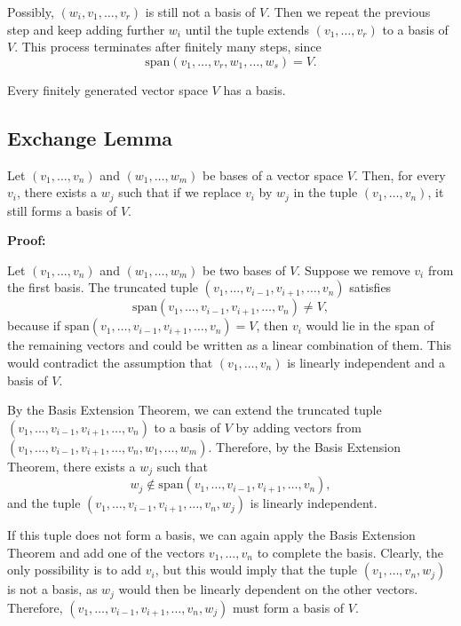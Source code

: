 Possibly, \((w_i, v_1, \ldots, v_r)\) is still not a basis of \(V\). Then we repeat the previous step and keep adding further \(w_i\) until the tuple extends \((v_1, \ldots, v_r)\) to a basis of \(V\). This process terminates after finitely many steps, since
\[
\text{span}(v_1, \ldots, v_r, w_1, \ldots, w_s) = V.
\]
\QED
\vspace{\baselineskip}

Every finitely generated vector space \(V\) has a basis.

\subsection{Exchange Lemma}

Let \((v_1, \ldots, v_n)\) and \((w_1, \ldots, w_m)\) be bases of a vector space \(V\). Then, for every \(v_i\), there exists a \(w_j\) such that if we replace \(v_i\) by \(w_j\) in the tuple \((v_1, \ldots, v_n)\), it still forms a basis of \(V\).
\vspace{\baselineskip}

\textbf{Proof:}

Let \((v_1, \ldots, v_n)\) and \((w_1, \ldots, w_m)\) be two bases of \(V\). Suppose we remove \(v_i\) from the first basis. The truncated tuple \((v_1, \ldots, v_{i-1}, v_{i+1}, \ldots, v_n)\) satisfies
\[
\text{span}(v_1, \ldots, v_{i-1}, v_{i+1}, \ldots, v_n) \neq V,
\]
because if \(\text{span}(v_1, \ldots, v_{i-1}, v_{i+1}, \ldots, v_n) = V\), then \(v_i\) would lie in the span of the remaining vectors and could be written as a linear combination of them. This would contradict the assumption that \((v_1, \ldots, v_n)\) is linearly independent and a basis of \(V\).

By the Basis Extension Theorem, we can extend the truncated 
tuple \((v_1, \ldots, v_{i-1}, v_{i+1}, \ldots, v_n)\) to a basis of \(V\) by 
adding vectors from \((v_1, \ldots, v_{i-1}, v_{i+1}, \ldots, v_n, w_1, \ldots, w_m)\). 
Therefore, by the Basis Extension Theorem, there exists a \(w_j\) such that
\[
w_j \notin \text{span}(v_1, \ldots, v_{i-1}, v_{i+1}, \ldots, v_n),
\]
and the tuple \((v_1, \ldots, v_{i-1}, v_{i+1}, \ldots, v_n, w_j)\) is linearly independent.

If this tuple does not form a basis, we can again apply the Basis Extension Theorem 
and add one of the vectors \(v_1, \ldots, v_n\) to complete the basis. Clearly, the only possibility is to add \(v_i\), 
but this would imply that the tuple \((v_1, \ldots, v_n, w_j)\) is not a basis, as 
\(w_j\) would then be linearly dependent on the other vectors. 
Therefore, \((v_1, \ldots, v_{i-1}, v_{i+1}, \ldots, v_n, w_j)\) must form a basis of \(V\).

